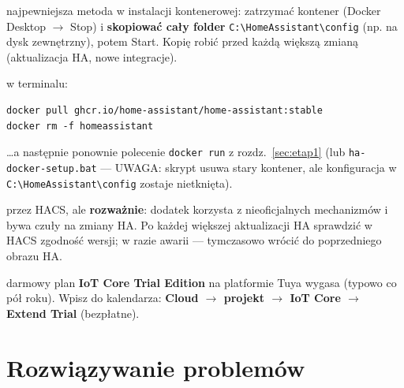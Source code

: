 \documentclass[11pt,a4paper]{article}
\begin{document}
\begin{description}[style=nextline]
\item[Kopia zapasowa] najpewniejsza metoda w instalacji kontenerowej: zatrzymać kontener (Docker Desktop $\to$ Stop) i \textbf{skopiować cały folder} \texttt{C:\textbackslash HomeAssistant\textbackslash config} (np. na dysk zewnętrzny), potem Start. Kopię robić przed każdą większą zmianą (aktualizacja HA, nowe integracje).
\item[Aktualizacja Home Assistant] w terminalu:
\begin{lstlisting}
docker pull ghcr.io/home-assistant/home-assistant:stable
docker rm -f homeassistant
\end{lstlisting}
\ldots{}a następnie ponownie polecenie \texttt{docker run} z rozdz.~\ref{sec:etap1} (lub \texttt{ha-docker-setup.bat} --- UWAGA: skrypt usuwa stary kontener, ale konfiguracja w \texttt{C:\textbackslash HomeAssistant\textbackslash config} zostaje nietknięta).
\item[Aktualizacje xtend\_tuya] przez HACS, ale \textbf{rozważnie}: dodatek korzysta z nieoficjalnych mechanizmów i bywa czuły na zmiany HA. Po każdej większej aktualizacji HA sprawdzić w HACS zgodność wersji; w razie awarii --- tymczasowo wrócić do poprzedniego obrazu HA.
\item[Przypomnienie okresowe] darmowy plan \textbf{IoT Core Trial Edition} na platformie Tuya wygasa (typowo co pół roku). Wpisz do kalendarza: \textbf{Cloud $\to$ projekt $\to$ IoT Core $\to$ Extend Trial} (bezpłatne).
\end{description}

\section{Rozwiązywanie problemów}
\label{sec:problemy}
\end{document}
